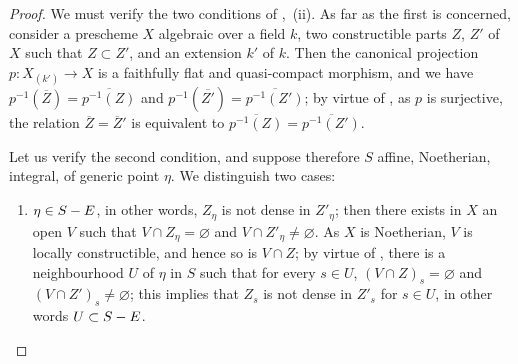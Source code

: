 \begin{proof}
We must verify the two conditions of ,~(ii).
As far as the first is concerned, consider a prescheme $X$ algebraic over a field $k$, two constructible parts $Z$, $Z'$ of $X$ such that $Z\subset Z'$, and an extension $k'$ of $k$.
Then the canonical projection $p:X_{(k')}\to X$ is a faithfully flat and quasi-compact morphism, and we have $p^{-1}(\overline{Z})=\overline{p^{-1}(Z)}$ and $p^{-1}(\overline{Z'})=\overline{p^{-1}(Z')}$; by virtue of , as $p$ is surjective, the relation $\overline{Z}=\overline Z'$ is equivalent to $\overline{p^{-1}(Z)}=\overline{p^{-1}(Z')}$.

Let us verify the second condition, and suppose therefore $S$ affine, Noetherian, integral, of generic point $\eta$.
We distinguish two cases:
\begin{enumerate}[label=\upshape{$\arabic{enumi}^\circ$}]
  \item $\eta\in S- E$, in other words, $Z_\eta$ is not dense in $Z'_\eta$; then there exists in $X$ an open $V$ such that $V\cap Z_\eta=\varnothing$ and $V\cap Z'_\eta\neq\varnothing$.
  As $X$ is Noetherian, $V$ is locally constructible, and hence so is $V\cap Z$; by virtue of , there is a neighbourhood $U$ of $\eta$ in $S$ such that for every $s\in U$, $(V\cap Z)_s=\varnothing$ and $(V\cap Z')_s\neq\varnothing$; this implies that $Z_s$ is not dense in $Z'_s$ for $s\in U$, in other words $U\subset S- E$.



\end{enumerate}
\end{proof}
